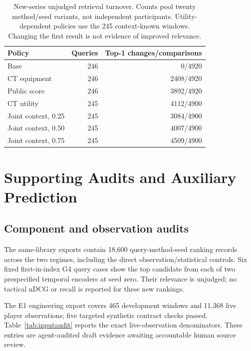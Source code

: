 \begin{table}[t]
\caption{New-series unjudged retrieval turnover. Counts pool twenty method/seed variants, not independent participants. Utility-dependent policies use the 245 context-known windows. Changing the first result is not evidence of improved relevance.}
\label{tab:transferretrieval}
\centering\small
\setlength{\tabcolsep}{4pt}
\begin{tabular}{lrr}
\toprule
Policy & Queries & Top-1 changes/comparisons\\
\midrule
Base & 246 & 0/4920 \\ %
CT equipment & 246 & 2408/4920 \\ %
Public score & 246 & 3892/4920 \\ %
CT utility & 245 & 4112/4900 \\ %
Joint context, 0.25 & 245 & 3084/4900 \\ %
Joint context, 0.50 & 245 & 4007/4900 \\ %
Joint context, 0.75 & 245 & 4509/4900 \\ %
\bottomrule
\end{tabular}
\end{table}

\section{Supporting Audits and Auxiliary Prediction}
\label{app:supporting}
\subsection{Component and observation audits}
The same-library exports contain 18,600 query-method-seed ranking records across the two regimes, including the direct observation/statistical controls. Six fixed first-in-index G4 query cases show the top candidate from each of two prespecified temporal encoders at seed zero. Their relevance is unjudged; no tactical nDCG or recall is reported for these new rankings. %

The E1 engineering export covers 465 development windows and 11,368 live player observations; five targeted synthetic contract checks passed. Table~\ref{tab:inputaudit} reports the exact live-observation denominators. These entries are agent-audited draft evidence awaiting accountable human source review. %

